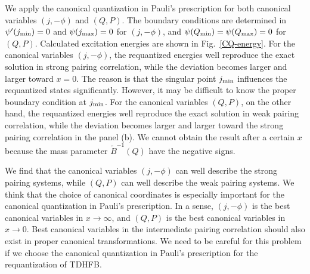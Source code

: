 \documentclass[11pt]{book} %
\begin{document}
We apply the canonical quantization in Pauli's prescription for both canonical variables $(j, -\phi)$ and $(Q, P)$. The boundary conditions are determined in $\psi'(j_{\rm min})=0$ and $\psi(j_{\rm max})=0$ for $(j, -\phi)$, and $\psi(Q_{\rm min})=\psi(Q_{\rm max})=0$ for $(Q, P)$.
Calculated excitation energies are shown in Fig.~\ref{CQ-energy}. For the canonical variables $(j, -\phi)$, the requantized energies well reproduce the exact solution in strong pairing correlation, while the deviation becomes larger and larger toward $x=0$. The reason is that the singular point $j_{\rm min}$ influences the requantized states significantly. However, it may be difficult to know the proper boundary condition at $j_{\rm min}$. For the canonical variables $(Q, P)$, on the other hand, the requantized energies well reproduce the exact solution in weak pairing correlation, while the deviation becomes larger and larger toward the strong pairing correlation in the panel (b). We cannot obtain the result after a certain $x$ because the mass parameter $\tilde{B}^{-1}(Q)$ have the negative signs.

We find that the canonical variables $(j, -\phi)$ can well describe the strong pairing systems, while $(Q, P)$ can well describe the weak pairing systems. We think that the choice of canonical coordinates is especially important for the canonical quantization in Pauli's prescription. In a sense, $(j, -\phi)$ is the best canonical variables in $x\to\infty$, and $(Q, P)$ is the best canonical variables in $x\to 0$. Best canonical variables in the intermediate pairing correlation should also exist in proper canonical transformations. We need to be careful for this problem if we choose the canonical quantization in Pauli's prescription for the requantization of TDHFB.
\end{document}
